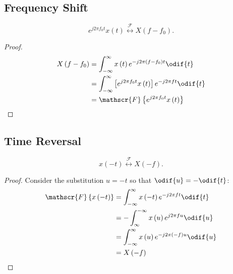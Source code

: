\documentclass{article}
\begin{document}
\subsection{Frequency Shift}
\begin{equation*}
    e^{j 2\pi f_0 t} x\left( t \right) \overset{\mathscr{F}}{\longleftrightarrow} X\left( f - f_0 \right).
\end{equation*}
\begin{proof}
    \begin{align*}
        X\left( f - f_0 \right) & = \int_{-\infty}^\infty x\left( t \right) e^{-j 2\pi \left( f - f_0 \right) t} \odif{t}            \\
                                & = \int_{-\infty}^\infty \left[ e^{j 2\pi f_0 t} x\left( t \right) \right] e^{-j 2\pi f t} \odif{t} \\
                                & = \mathscr{F}\left\{ e^{j 2\pi f_0 t} x\left( t \right) \right\}
    \end{align*}
\end{proof}
\subsection{Time Reversal}
\begin{equation*}
    x\left( -t \right) \overset{\mathscr{F}}{\longleftrightarrow} X\left( -f \right).
\end{equation*}
\begin{proof}
    Consider the substitution \(u = -t\) so that \(\odif{u} = -\odif{t}\):
    \begin{align*}
        \mathscr{F}\left\{ x\left( -t \right) \right\} & = \int_{-\infty}^\infty x\left( -t \right) e^{-j 2\pi f t} \odif{t}                \\
                                                       & = -\int_\infty^{-\infty} x\left( u \right) e^{j 2\pi f u} \odif{u}                 \\
                                                       & = \int_{-\infty}^\infty x\left( u \right) e^{-j 2\pi \left( -f \right) u} \odif{u} \\
                                                       & = X\left( -f \right)
    \end{align*}
\end{proof}
\end{document}
